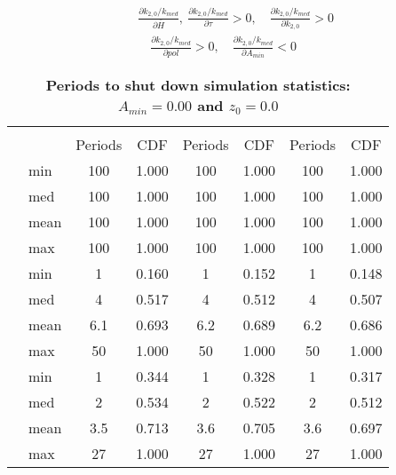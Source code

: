 \documentclass[letterpaper,12pt]{article}
\theoremstyle{definition}
\begin{document}
\begin{spacing}{1.5}
  \begin{equation*}
    \begin{split}
      &\frac{\partial k_{2,0}/k_{med}}{\partial\bar{H}},\:\frac{\partial k_{2,0}/k_{med}}{\partial\tau}>0, \quad \frac{\partial k_{2,0}/k_{med}}{\partial k_{2,0}}> 0 \\
      &\quad \frac{\partial k_{2,0}/k_{med}}{\partial pol}> 0, \quad \frac{\partial k_{2,0}/k_{med}}{\partial A_{min}}< 0
    \end{split}
  \end{equation*}

  \newpage

  \begin{table}[htbp]\centering\captionsetup{width=4.6in}
  \caption{\label{TabPer2GO_A0}\textbf{Periods to shut down simulation statistics: $A_{min}=0.00$ and $z_0=0.0$}}
    \begin{threeparttable}
    \begin{tabular}{>{\small}c >{\small}l| >{\small}c >{\small}c| >{\small}c >{\small}c| >{\small}c >{\small}c}
      \hline\hline
      & & \multicolumn{2}{c}{$k_{2,0}=0.11$} & \multicolumn{2}{c}{$k_{2,0}=0.14$} & \multicolumn{2}{c}{$k_{2,0}=0.17$} \\ \cline{3-8}
      & & Periods & CDF & Periods & CDF & Periods & CDF \\
      \hline
      \multirow{4}{*}{$\bar{H}=0.00$}
      & min & 100 & 1.000 & 100 & 1.000 & 100 & 1.000 \\
      & med & 100 & 1.000 & 100 & 1.000 & 100 & 1.000 \\
      & mean & 100 & 1.000 & 100 & 1.000 & 100 & 1.000 \\
      & max & 100 & 1.000 & 100 & 1.000 & 100 & 1.000 \\
      \hline
      \multirow{4}{*}{$\bar{H}=0.05$}
      & min & 1 & 0.160 & 1 & 0.152 & 1 & 0.148 \\
      & med & 4 & 0.517 & 4 & 0.512 & 4 & 0.507 \\
      & mean & 6.1 & 0.693 & 6.2 & 0.689 & 6.2 & 0.686 \\
      & max & 50 & 1.000 & 50 & 1.000 & 50 & 1.000 \\
      \hline
      \multirow{4}{*}{$\bar{H}=0.11$}
      & min & 1 & 0.344 & 1 & 0.328 & 1 & 0.317 \\
      & med & 2 & 0.534 & 2 & 0.522 & 2 & 0.512 \\
      & mean & 3.5 & 0.713 & 3.6 & 0.705 & 3.6 & 0.697 \\
      & max & 27 & 1.000 & 27 & 1.000 & 27 & 1.000 \\

\end{tabular}
\end{threeparttable}
\end{table}
\end{spacing}
\end{document}
